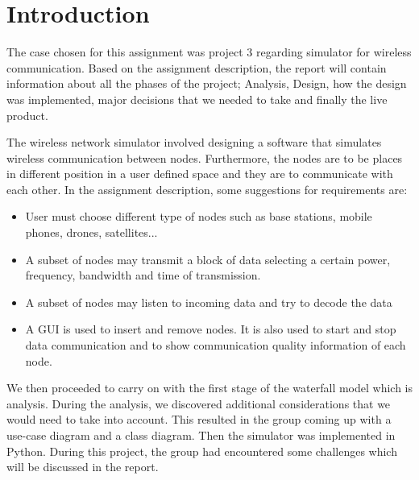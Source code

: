 \chapter{Introduction}\label{ch:introduction}

The case chosen for this assignment was project 3 regarding simulator for wireless communication. Based on the assignment description, the report will contain information about all the phases of the project; Analysis, Design, how the design was implemented, major decisions that we needed to take and finally the live product.\bigbreak

The wireless network simulator involved designing a software that simulates wireless communication between nodes. Furthermore, the nodes are to be places in different position in a user defined space and they are to communicate with each other. In the assignment description, some suggestions for requirements are:
\begin{itemize}
    \item User must choose different type of nodes such as base stations, mobile phones, drones, satellites...
    \item A subset of nodes may transmit a block of data selecting a certain power, frequency, bandwidth and time of transmission.
    \item A subset of nodes may listen to incoming data and try to decode the data
    \item A GUI is used to insert and remove nodes. It is also used to start and stop data communication and to show communication quality information of each node.
\end{itemize}

We then proceeded to carry on with the first stage of the waterfall model which is analysis. During the analysis, we discovered additional considerations that we would need to take into account. This resulted in the group coming up with a use-case diagram and a class diagram. Then the simulator was implemented in Python. During this project, the group had encountered some challenges which will be discussed in the report.







